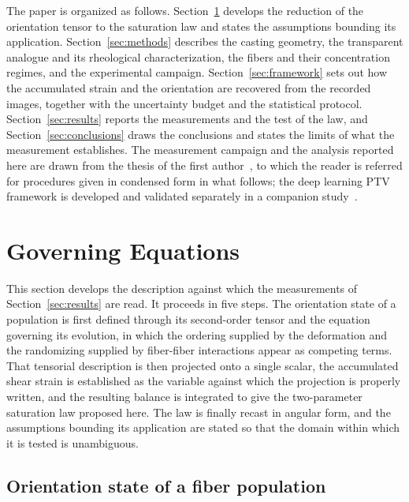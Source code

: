 \documentclass[%
  aip,
  pof,          %
  reprint,      %
  floatfix
]{revtex4-2}
\begin{document}
The paper is organized as follows. Section~\ref{sec:governing} develops the reduction of the orientation tensor to the saturation law and states the assumptions bounding its application. Section~\ref{sec:methods} describes the casting geometry, the transparent analogue and its rheological characterization, the fibers and their concentration regimes, and the experimental campaign. Section~\ref{sec:framework} sets out how the accumulated strain and the orientation are recovered from the recorded images, together with the uncertainty budget and the statistical protocol. Section~\ref{sec:results} reports the measurements and the test of the law, and Section~\ref{sec:conclusions} draws the conclusions and states the limits of what the measurement establishes. The measurement campaign and the analysis reported here are drawn from the thesis of the first author~\cite{wolff2026thesis}, to which the reader is referred for procedures given in condensed form in what follows; the deep learning PTV framework is developed and validated separately in a companion study~\cite{wolff2025ptv}.


\section{Governing Equations}
\label{sec:governing}

This section develops the description against which the measurements of Section~\ref{sec:results} are read. It proceeds in five steps. The orientation state of a population is first defined through its second-order tensor and the equation governing its evolution, in which the ordering supplied by the deformation and the randomizing supplied by fiber-fiber interactions appear as competing terms. That tensorial description is then projected onto a single scalar, the accumulated shear strain is established as the variable against which the projection is properly written, and the resulting balance is integrated to give the two-parameter saturation law proposed here. The law is finally recast in angular form, and the assumptions bounding its application are stated so that the domain within which it is tested is unambiguous.

\subsection{Orientation state of a fiber population}
\label{sec:governing_state}
\end{document}
